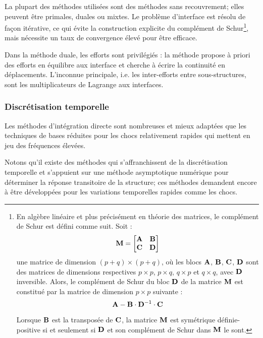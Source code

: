 La plupart des méthodes utilisées sont des méthodes sans recouvrement; elles
peuvent être primales, duales ou mixtes. Le problème d'interface est résolu
de façon itérative, ce qui évite la construction explicite du complément
de Schur\footnote{%
En algèbre linéaire et plus précisément en théorie des matrices, le complément de
Schur est défini comme suit. Soit :
\begin{equation} \MM{M}=\MM*{\MM{A} & \MM{B} \\ \MM{C} & \MM{D}} \end{equation}
une matrice de dimension $(p+q)\times(p+q)$, où les blocs $\MM{A}$, $\MM{B}$, $\MM{C}$, $\MM{D}$ sont des matrices
de dimensions respectives $p\times p$, $p\times q$, $q\times p$ et $q\times q$, avec $\MM{D}$ inversible.
Alors, le complément de Schur du bloc $\MM{D}$ de la matrice $\MM{M}$ est constitué par la matrice
de dimension $p\times p$ suivante :
\begin{equation} \MM{A} - \MM{B}\cdot \MMI{D}\cdot \MM{C}\end{equation}

Lorsque $\MM{B}$ est la transposée de $\MM{C}$, la matrice $\MM{M}$ est symétrique définie-positive
si et seulement si $\MM{D}$ et son complément de Schur dans $\MM{M}$ le sont.
}, mais nécessite un taux de convergence élevé pour être
efficace.

Dans la méthode duale, les efforts sont privilégiés : la méthode propose
à priori des efforts en équilibre aux interface et cherche à écrire la continuité
en déplacements. L'inconnue principale, i.e. les inter-efforts entre sous-structures,
sont les multiplicateurs de Lagrange aux interfaces.

\medskip
\subsubsection{Discrétisation temporelle}

Les méthodes d'intégration directe sont nombreuses et mieux adaptées que les
techniques de bases réduites pour les chocs relativement rapides qui mettent en jeu des
fréquences élevées.

Notons qu'il existe des méthodes qui s'affranchissent de la discrétisation temporelle et
s'appuient sur une méthode asymptotique numérique pour déterminer la réponse
transitoire de la structure; ces méthodes demandent encore à être
développées pour les variations temporelles rapides comme les chocs.

